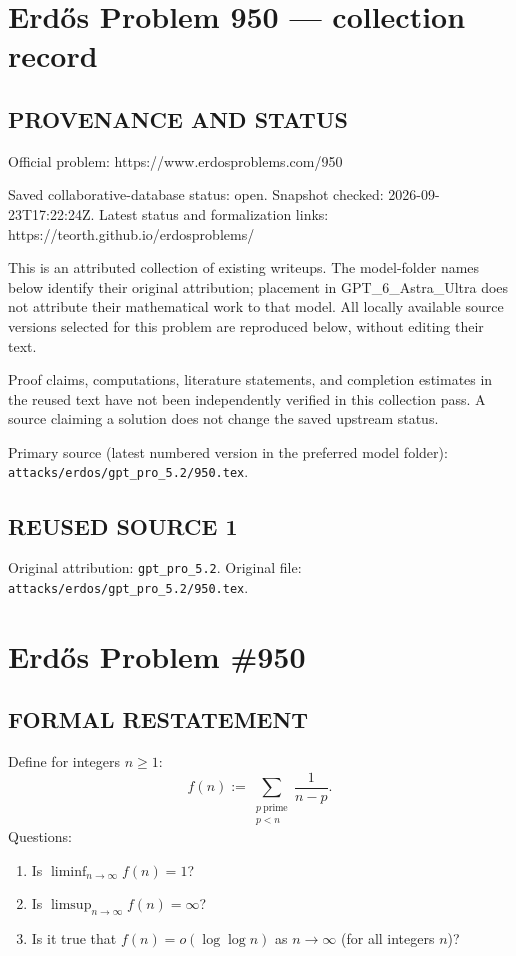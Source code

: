 \section*{Erd\H{o}s Problem 950 --- collection record}

\subsection*{PROVENANCE AND STATUS}
Official problem: https://www.erdosproblems.com/950

Saved collaborative-database status: open.
Snapshot checked: 2026-09-23T17:22:24Z.
Latest status and formalization links: https://teorth.github.io/erdosproblems/

This is an attributed collection of existing writeups. The model-folder names below identify their original attribution; placement in GPT\_6\_Astra\_Ultra does not attribute their mathematical work to that model. All locally available source versions selected for this problem are reproduced below, without editing their text.

Proof claims, computations, literature statements, and completion estimates in the reused text have not been independently verified in this collection pass. A source claiming a solution does not change the saved upstream status.

Primary source (latest numbered version in the preferred model folder): \texttt{attacks/erdos/gpt\_pro\_5.2/950.tex}.

\subsection*{REUSED SOURCE 1}
Original attribution: \texttt{gpt\_pro\_5.2}.
Original file: \texttt{attacks/erdos/gpt\_pro\_5.2/950.tex}.


\section*{Erd\H{o}s Problem \#950}

\subsection*{FORMAL RESTATEMENT}
Define for integers $n\ge 1$:
\[
f(n):=\sum_{\substack{p\ \text{prime}\\ p<n}}\frac{1}{n-p}.
\]
Questions:
\begin{enumerate}
\item Is $\liminf_{n\to\infty} f(n)=1$?
\item Is $\limsup_{n\to\infty} f(n)=\infty$?
\item Is it true that $f(n)=o(\log\log n)$ as $n\to\infty$ (for all integers $n$)?
\end{enumerate}

